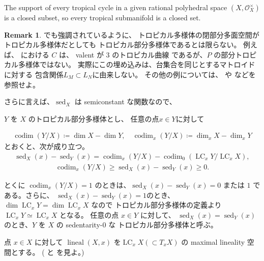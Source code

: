 \documentclass[a4paper,dvipdfmx,reqno,12pt]{amsart}
\theoremstyle{definition}
\newtheorem{remark}[theorem]{Remark}
\newcommand{\deq}{\coloneqq}
\newcommand{\opn}[1]{\operatorname{#1}}
\numberwithin{equation}{section}
\begin{document}
The support of every tropical cycle in a given
rational polyhedral space $(X,\mathcal{O}_X^{\times})$ is
a closed subset, so every tropical submanifold is
a closed set.

\begin{remark}
\cite[Example 2.15]{demedrano2023chern}でも強調されているように、
トロピカル多様体の閉部分多面空間がトロピカル多様体だとしても
トロピカル部分多様体であるとは限らない。
例えば、
\cite[Example 2.21]{shaw2015tropical}
における $C$ は、 valent が $3$ のトロピカル曲線
であるが、$P$ の部分トロピカル多様体ではない。
実際にこの埋め込みは、台集合を同じとするマトロイドに対する
包含関係$L_M\subset L_N$に由来しない。
その他の例については、
\cite{MR2594592} や \cite{MR3339531}
などを参照せよ。


\end{remark}


さらに言えば、$\opn{sed}_X$ は
semiconstant な関数なので、




$Y$ を $X$ 
のトロピカル部分多様体とし、
任意の点$x\in Y$に対して

\begin{align}
\opn{codim}(Y/X)\deq \dim X -\dim Y,\quad 
\opn{codim}_x(Y/X)\deq \dim_x X -\dim_x Y
\end{align}
とおくと、次が成り立つ。
\begin{align}
\opn{sed}_X(x)-\opn{sed}_Y(x)=
\opn{codim}_x(Y/X)-\opn{codim}_0(\opn{LC}_x Y/\opn{LC}_xX),
\end{align}
\begin{align}
\opn{codim}_x(Y/X) \geq 
\opn{sed}_X(x)-\opn{sed}_Y(x)\geq 0.
\end{align}

とくに $\opn{codim}_x(Y/X)=1$
のときは、$\opn{sed}_X(x)-\opn{sed}_Y(x)=0$ または
$1$ である。さらに、
$\opn{sed}_X(x)-\opn{sed}_Y(x)=1$のとき、
$\dim \opn{LC}_x Y=\dim \opn{LC}_x X$
なので トロピカル部分多様体の定義より
$\opn{LC}_x Y\simeq \opn{LC}_x X$
となる。
任意の点 $x\in Y$ に対して、
$\opn{sed}_X(x)=\opn{sed}_Y(x)$ 
のとき、$Y$ を $X$ の sedentarity-0 な
トロピカル部分多様体と呼ぶ。 

点 $x\in X$ に対して
$\opn{lineal}(X,x)$ を$\opn{LC}_x X (\subset T_x X)$
の maximal lineality 空間とする。
(\cite[]{MR4246795} と
\cite[]{demedrano2023chern} を見よ。)
\end{document}
